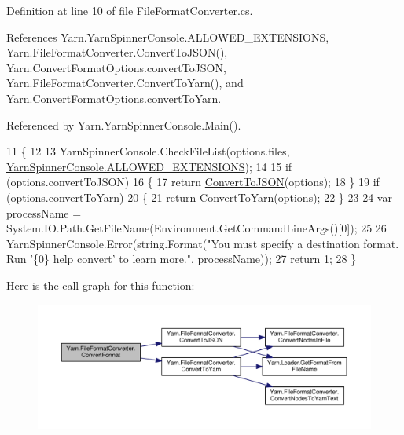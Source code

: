 Definition at line 10 of file File\-Format\-Converter.\-cs.



References Yarn.\-Yarn\-Spinner\-Console.\-A\-L\-L\-O\-W\-E\-D\-\_\-\-E\-X\-T\-E\-N\-S\-I\-O\-N\-S, Yarn.\-File\-Format\-Converter.\-Convert\-To\-J\-S\-O\-N(), Yarn.\-Convert\-Format\-Options.\-convert\-To\-J\-S\-O\-N, Yarn.\-File\-Format\-Converter.\-Convert\-To\-Yarn(), and Yarn.\-Convert\-Format\-Options.\-convert\-To\-Yarn.



Referenced by Yarn.\-Yarn\-Spinner\-Console.\-Main().


\begin{DoxyCode}
11         \{
12 
13             YarnSpinnerConsole.CheckFileList(options.files, 
      \hyperlink{a00189_a0979de7ea02c8c0375b8220a12e6575e}{YarnSpinnerConsole.ALLOWED\_EXTENSIONS});
14 
15             \textcolor{keywordflow}{if} (options.convertToJSON)
16             \{
17                 \textcolor{keywordflow}{return} \hyperlink{a00099_a28a086a7b44ecea7430af40436f38df6}{ConvertToJSON}(options);
18             \}
19             \textcolor{keywordflow}{if} (options.convertToYarn)
20             \{
21                 \textcolor{keywordflow}{return} \hyperlink{a00099_a1e6cd39b0c813f21da278367dcff76d2}{ConvertToYarn}(options);
22             \}
23 
24             var processName = System.IO.Path.GetFileName(Environment.GetCommandLineArgs()[0]);
25 
26             YarnSpinnerConsole.Error(string.Format(\textcolor{stringliteral}{"You must specify a destination format. Run '\{0\} help
       convert' to learn more."}, processName));
27             \textcolor{keywordflow}{return} 1;
28         \}
\end{DoxyCode}


Here is the call graph for this function\-:
\nopagebreak
\begin{figure}[H]
\begin{center}
\leavevmode
\includegraphics[width=350pt]{a00099_aa4db4ccac799c5f047a8b1a9efbe109d_cgraph}
\end{center}
\end{figure}




